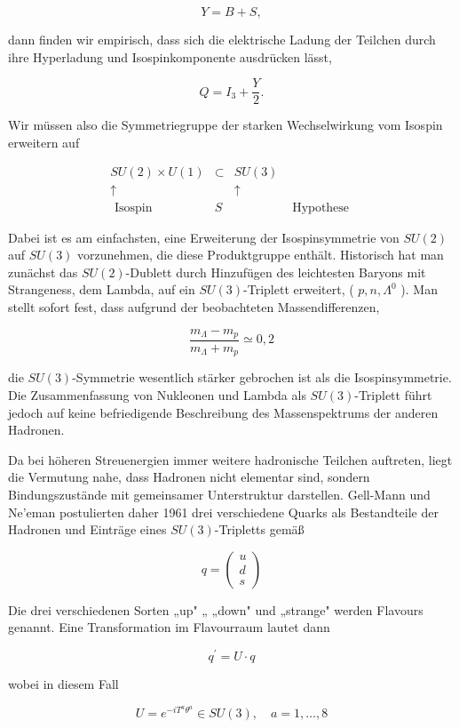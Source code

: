 \documentclass[10pt, letterpaper]{article}
\begin{document}
$$
Y=B+S,
$$

dann finden wir empirisch, dass sich die elektrische Ladung der Teilchen durch ihre Hyperladung und Isospinkomponente ausdrücken lässt,

$$
Q=I_{3}+\frac{Y}{2} .
$$

Wir müssen also die Symmetriegruppe der starken Wechselwirkung vom Isospin erweitern auf

$$
\begin{array}{cccc}
S U(2) \times U(1) & \subset & S U(3) \\
\uparrow & & \uparrow \\
\text { Isospin } & S & & \text { Hypothese }
\end{array}
$$

Dabei ist es am einfachsten, eine Erweiterung der Isospinsymmetrie von $S U(2)$ auf $S U(3)$ vorzunehmen, die diese Produktgruppe enthält. Historisch hat man zunächst das $S U(2)$-Dublett durch Hinzufügen des leichtesten Baryons mit Strangeness, dem Lambda, auf ein $S U(3)$-Triplett erweitert, ( $p, n, \Lambda^{0}$ ). Man stellt sofort fest, dass aufgrund der beobachteten Massendifferenzen,

$$
\frac{m_{\Lambda}-m_{p}}{m_{\Lambda}+m_{p}} \simeq 0,2
$$

die $S U(3)$-Symmetrie wesentlich stärker gebrochen ist als die Isospinsymmetrie. Die Zusammenfassung von Nukleonen und Lambda als $S U(3)$-Triplett führt jedoch auf keine befriedigende Beschreibung des Massenspektrums der anderen Hadronen.

Da bei höheren Streuenergien immer weitere hadronische Teilchen auftreten, liegt die Vermutung nahe, dass Hadronen nicht elementar sind, sondern Bindungszustände mit gemeinsamer Unterstruktur darstellen. Gell-Mann und Ne'eman postulierten daher 1961 drei verschiedene Quarks als Bestandteile der Hadronen und Einträge eines $S U(3)$-Tripletts gemäß

$$
q=\left(\begin{array}{l}
u \\
d \\
s
\end{array}\right)
$$

Die drei verschiedenen Sorten „up" „ „down" und „strange" werden Flavours genannt. Eine Transformation im Flavourraum lautet dann

$$
q^{\prime}=U \cdot q
$$

wobei in diesem Fall

$$
U=e^{-i T^{a} \theta^{a}} \in S U(3), \quad a=1, \ldots, 8
$$
\end{document}
